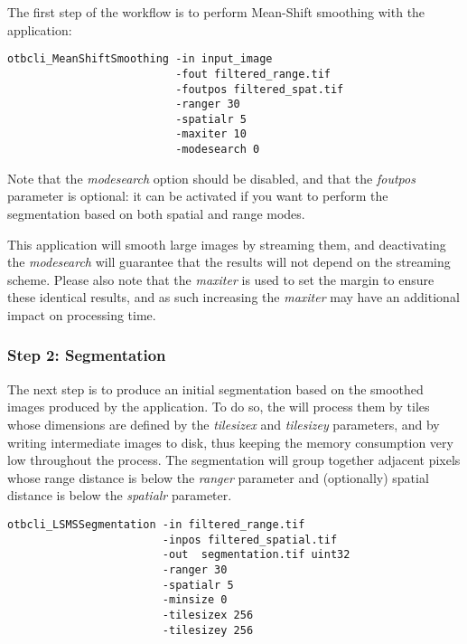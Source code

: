 The first step of the workflow is to perform Mean-Shift smoothing with
the  application:

\begin{verbatim}
otbcli_MeanShiftSmoothing -in input_image 
                          -fout filtered_range.tif 
                          -foutpos filtered_spat.tif 
                          -ranger 30 
                          -spatialr 5 
                          -maxiter 10 
                          -modesearch 0
\end{verbatim}

Note that the \emph{modesearch} option should be disabled, and
that the \emph{foutpos} parameter is optional: it can be activated
if you want to perform the segmentation based on both spatial and
range modes.

This application will smooth large images by streaming them, and
deactivating the \emph{modesearch} will guarantee that the results
will not depend on the streaming scheme. Please also note that the
\emph{maxiter} is used to set the margin to ensure these
identical results, and as such increasing the \emph{maxiter} may
have an additional impact on processing time.

\subsubsection{Step 2: Segmentation}

The next step is to produce an initial segmentation based on the
smoothed images produced by the 
application. To do so, the  will process
them by tiles whose dimensions are defined by the
\emph{tilesizex} and \emph{tilesizey} parameters, and by
writing intermediate images to disk, thus keeping the memory
consumption very low throughout the process. The segmentation will
group together adjacent pixels whose range distance is below the
\emph{ranger} parameter and (optionally) spatial distance is
below the \emph{spatialr} parameter.

\begin{verbatim}
otbcli_LSMSSegmentation -in filtered_range.tif
                        -inpos filtered_spatial.tif
                        -out  segmentation.tif uint32 
                        -ranger 30 
                        -spatialr 5 
                        -minsize 0 
                        -tilesizex 256 
                        -tilesizey 256
\end{verbatim}

